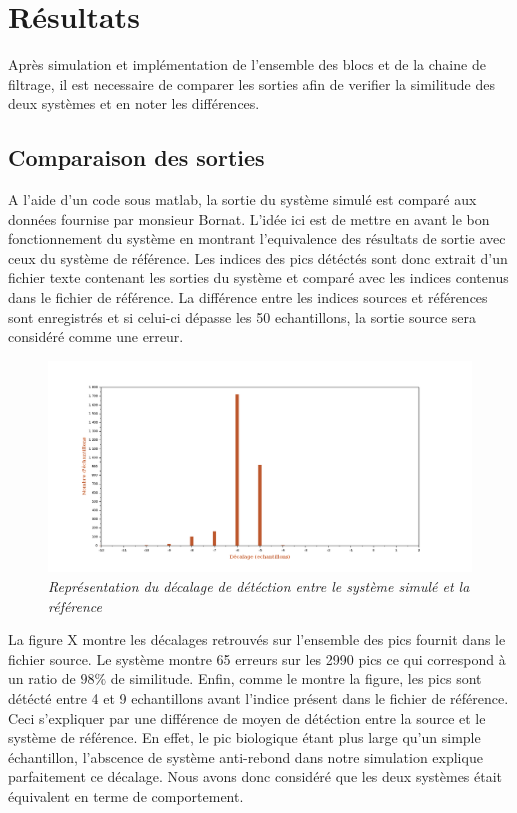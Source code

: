 \documentclass[a4paper,12pt]{article}
\begin{document}
\section{Résultats}
	Après simulation et implémentation de l'ensemble des blocs et de la chaine de filtrage, il est necessaire de comparer les sorties afin de verifier la similitude des deux systèmes et en noter les différences.
\subsection{Comparaison des sorties}
A l'aide d'un code sous matlab, la sortie du système simulé est comparé aux données fournise par monsieur Bornat.
L'idée ici est de mettre en avant le bon fonctionnement du système en montrant l'equivalence des résultats de sortie avec ceux du système de référence.
Les indices des pics détéctés sont donc extrait d'un fichier texte contenant les sorties du système et comparé avec les indices contenus dans le fichier de référence.
La différence entre les indices sources et références sont enregistrés et si celui-ci dépasse les 50 echantillons, la sortie source sera considéré comme une erreur. 
\begin{figure}[H]
	\centering
	\includegraphics[scale=0.3, keepaspectratio]{ResultatSim.png}
	\caption{\textit{Représentation du décalage de détéction entre le système simulé et la référence}}
\end{figure}
La figure X montre les décalages retrouvés sur l'ensemble des pics fournit dans le fichier source. Le système montre 65 erreurs sur les 2990 pics ce qui correspond à un ratio de $98\%$ de similitude.
Enfin, comme le montre la figure, les pics sont détécté entre 4 et 9 echantillons avant l'indice présent dans le fichier de référence. Ceci s'expliquer par une différence de moyen de détéction entre la source et le système de référence.
En effet, le pic biologique étant plus large qu'un simple échantillon, l'abscence de système anti-rebond dans notre simulation explique parfaitement ce décalage.
Nous avons donc considéré que les deux systèmes était équivalent en terme de comportement.
\newpage
\end{document}
